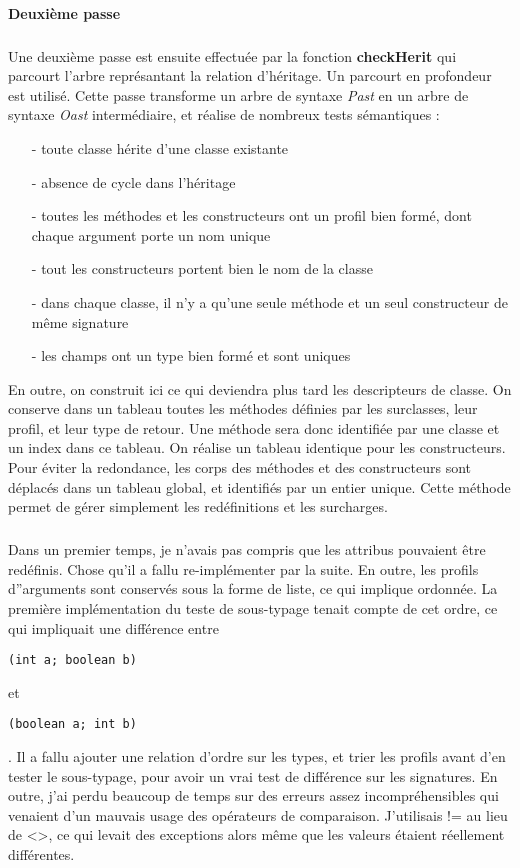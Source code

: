 \documentclass{article}
\begin{document}
\paragraph{Deuxième passe}
\subparagraph*{}
Une deuxième passe est ensuite effectuée par la fonction \textbf{checkHerit} qui parcourt l'arbre représantant la relation d'héritage. Un parcourt en profondeur est utilisé. Cette passe transforme un arbre de syntaxe \emph{Past} en un arbre de syntaxe \emph{Oast} intermédiaire, et réalise de nombreux tests sémantiques :
\begin{itemize} 
  \item[-] toute classe hérite d'une classe existante
  \item[-] absence de cycle dans l'héritage
  \item[-] toutes les méthodes et les constructeurs ont un profil bien formé, dont chaque argument porte un nom unique
  \item[-] tout les constructeurs portent bien le nom de la classe
  \item[-] dans chaque classe, il n'y a qu'une seule méthode et un seul constructeur de même signature
  \item[-] les champs ont un type bien formé et sont uniques
\end{itemize}
En outre, on construit ici ce qui deviendra plus tard les descripteurs de classe. On conserve dans un tableau toutes les méthodes définies par les surclasses, leur profil, et leur type de retour. Une méthode sera donc identifiée par une classe et un index dans ce tableau. On réalise un tableau identique pour les constructeurs. Pour éviter la redondance, les corps des méthodes et des constructeurs sont déplacés dans un tableau global, et identifiés par un entier unique. Cette méthode permet de gérer simplement les redéfinitions et les surcharges. 
\subparagraph*{}
Dans un premier temps, je n'avais pas compris que les attribus pouvaient être redéfinis. Chose qu'il a fallu re-implémenter par la suite. En outre, les profils d''arguments sont conservés sous la forme de liste, ce qui implique ordonnée. La première implémentation du teste de sous-typage tenait compte de cet ordre, ce qui impliquait  une différence entre \begin{verbatim}(int a; boolean b)\end{verbatim} et \begin{verbatim}(boolean a; int b)\end{verbatim}. Il a fallu ajouter une relation d'ordre sur les types, et trier les profils avant d'en tester le sous-typage, pour avoir un vrai test de différence sur les signatures. En outre, j'ai perdu beaucoup de temps sur des erreurs assez incompréhensibles qui venaient d'un mauvais usage des opérateurs de comparaison. J'utilisais != au lieu de <>, ce qui levait des exceptions alors même que les valeurs étaient réellement différentes.
\end{document}
